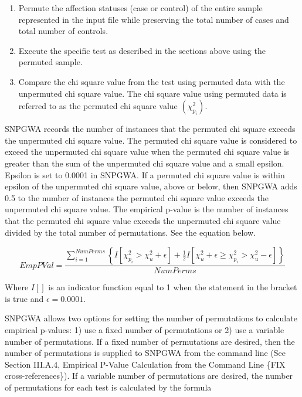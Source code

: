 \begin{enumerate}
\item Permute the affection statuses (case or control) of the entire sample
  represented in the input file while preserving the total number of cases and
  total number of controls.

\item Execute the specific test as described in the sections above using the
  permuted sample.

\item Compare the chi square value from the test using permuted data with the
  unpermuted chi square value.  The chi square value using permuted data is
  referred to as the permuted chi square value $\left(\chi^2_{p_{i}}\right)$.

\end{enumerate}

SNPGWA records the number of instances that the permuted chi square exceeds the
unpermuted chi square value.  The permuted chi square value is considered to
exceed the unpermuted chi square value when the permuted chi square value is
greater than the sum of the unpermuted chi square value and a small epsilon.
Epsilon is set to 0.0001 in SNPGWA.  If a permuted chi square value is within
epsilon of the unpermuted chi square value, above or below, then SNPGWA adds 0.5
to the number of instances the permuted chi square value exceeds the unpermuted
chi square value.  The empirical p-value is the number of instances that the
permuted chi square value exceeds the unpermuted chi square value divided by the
total number of permutations.  See the equation below.

\begin{equation*}
  EmpPVal = \frac{\sum^{NumPerms}_{i=1}\left\{I[\chi^2_{p_{i}} > \chi^2_{u} + \epsilon] + \frac{1}{2}I[\chi^2_u + \epsilon \ge \chi^2_{p_{i}} > \chi^2_{u} - \epsilon]\right\}}{NumPerms}
\end{equation*}

Where $I[]$ is an indicator function equal to 1 when the statement in
the bracket is true and $\epsilon = 0.0001$.

SNPGWA allows two options for setting the number of permutations to calculate
empirical p-values: 1) use a fixed number of permutations or 2) use a variable
number of permutations.  If a fixed number of permutations are desired, then the
number of permutations is supplied to SNPGWA from the command line (See Section
III.A.4, Empirical P-Value Calculation from the Command Line \{FIX
cross-references\}).  If a variable number of permutations are desired, the
number of permutations for each test is calculated by the formula

